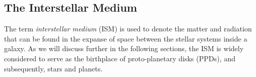 



\clearpage\subsection{The Interstellar Medium}

    The term \textit{interstellar medium} (ISM) is used to denote the matter and radiation that 
    can be found in the expanse of space between the stellar systems inside a galaxy. 
    As we will discuss further in the following sections, the ISM is widely considered to serve 
    as the birthplace of proto-planetary disks (PPDs), and subsequently, stars and planets. \\


